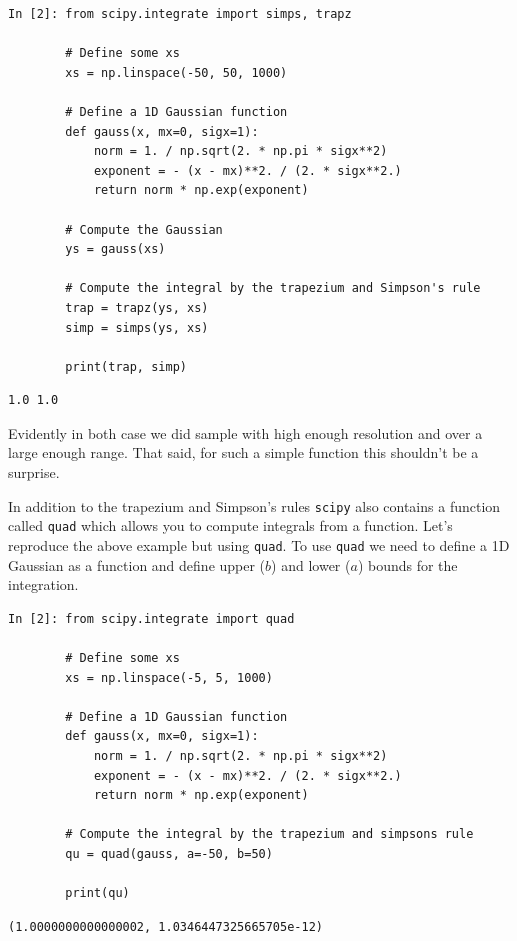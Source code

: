 \begin{lstlisting}[style=PY]
In [2]: from scipy.integrate import simps, trapz

        # Define some xs
        xs = np.linspace(-50, 50, 1000)
        
        # Define a 1D Gaussian function
        def gauss(x, mx=0, sigx=1):
            norm = 1. / np.sqrt(2. * np.pi * sigx**2)
            exponent = - (x - mx)**2. / (2. * sigx**2.)
            return norm * np.exp(exponent)
        
        # Compute the Gaussian
        ys = gauss(xs)
        
        # Compute the integral by the trapezium and Simpson's rule 
        trap = trapz(ys, xs)
        simp = simps(ys, xs)
        
        print(trap, simp)
\end{lstlisting}
\begin{lstlisting}[style=PY, backgroundcolor=\color{white}]
        1.0 1.0
\end{lstlisting}

Evidently in both case we did sample with high enough resolution and over a large enough range. That said, for such a simple function this shouldn't be a surprise.

\newpage

In addition to the trapezium and Simpson's rules \texttt{scipy} also contains a function called \texttt{quad} which allows you to compute integrals from a function. Let's reproduce the above example but using \texttt{quad}. To use \texttt{quad} we need to define a 1D Gaussian as a function and define upper ($b$) and lower ($a$) bounds for the integration.

\begin{lstlisting}[style=PY]
In [2]: from scipy.integrate import quad

        # Define some xs
        xs = np.linspace(-5, 5, 1000)
        
        # Define a 1D Gaussian function
        def gauss(x, mx=0, sigx=1):
            norm = 1. / np.sqrt(2. * np.pi * sigx**2)
            exponent = - (x - mx)**2. / (2. * sigx**2.)
            return norm * np.exp(exponent)
        
        # Compute the integral by the trapezium and simpsons rule 
        qu = quad(gauss, a=-50, b=50)

        print(qu)
\end{lstlisting}
\begin{lstlisting}[style=PY, backgroundcolor=\color{white}]
        (1.0000000000000002, 1.0346447325665705e-12)
\end{lstlisting}

